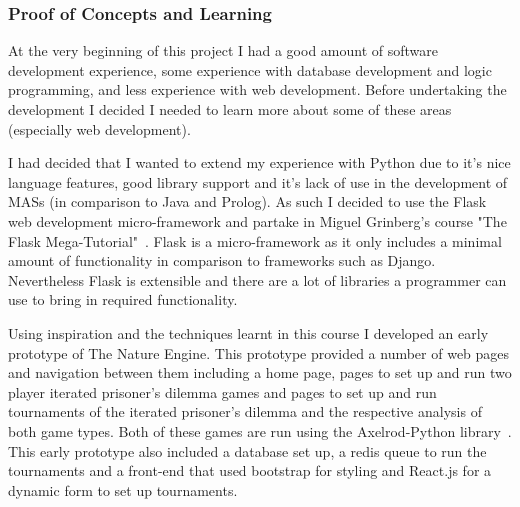 \documentclass[]{final_report}
\begin{document}
\subsubsection{Proof of Concepts and Learning}
At the very beginning of this project I had a good amount of software development experience, some experience with database development and logic programming, and less experience with web development. Before undertaking the development I decided I needed to learn more about some of these areas (especially web development).\par 
I had decided that I wanted to extend my experience with Python due to it's nice language features, good library support and it's lack of use in the development of MASs (in comparison to Java and Prolog). As such I decided to use the Flask web development micro-framework and partake in Miguel Grinberg's course "The Flask Mega-Tutorial"~\cite{flask_tut}. Flask is a micro-framework as it only includes a minimal amount of functionality in comparison to frameworks such as Django. Nevertheless Flask is extensible and there are a lot of libraries a programmer can use to bring in required functionality.\par 
Using inspiration and the techniques learnt in this course I developed an early prototype of The Nature Engine. This prototype provided a number of web pages and navigation between them including a home page, pages to set up and run two player iterated prisoner's dilemma games and pages to set up and run tournaments of the iterated prisoner's dilemma and the respective analysis of both game types. Both of these games are run using the Axelrod-Python library~\cite{axelrodproject}. This early prototype also included a database set up, a redis queue to run the tournaments and a front-end that used bootstrap for styling and React.js for a dynamic form to set up tournaments.\par
\end{document}
